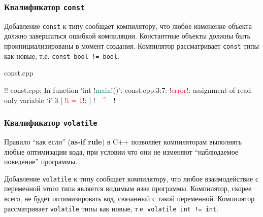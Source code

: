 \documentclass[compress, 8pt]{beamer}
\begin{document}
\begin{frame}[fragile]

    \frametitle{Квалификатор \texttt{const}}

    Добавление \verb|const| к типу сообщает компилятору, что
    любое изменение объекта должно завершаться ошибкой компиляции.
    Константные объекты должны быть проинициализированы в момент
    создания.
    Компилятор рассматривает \verb|const| типы как новые,
    т.е. \verb|const bool != bool|.

        {const.cpp}

    \begin{terminalwindow}
!!
const.cpp: In function ‘int !\textcolor{teal}{main}!()’:
const.cpp:3:7: !\textcolor{red}{error}!: assignment of read-only variable ‘i’
    3 |     !\textcolor{red}{i = 1}!;
      |      !\textcolor{red}{~~\^{}~~}!
    \end{terminalwindow}

\end{frame}

\begin{frame}[fragile]

    \frametitle{Квалификатор \texttt{volatile}}

    Правило \enquote{как если} (\textbf{as-if rule}) в C++ позволяет компиляторам
    выполнять любые оптимизации кода, при условии что они не изменяют
    \enquote{наблюдаемое поведение} программы.

    \hfill \break

    Добавление \verb|volatile| к типу сообщает компилятору, что
    любое взаимодействие с переменной этого типа является
    видимым изве программы. Компилятор, скорее всего, не
    будет оптимизировать код, связанный с такой переменной.
    Компилятор рассматривает \verb|volatile| типы как новые,
    т.е. \verb|volatile int != int|.

\end{frame}
\end{document}
